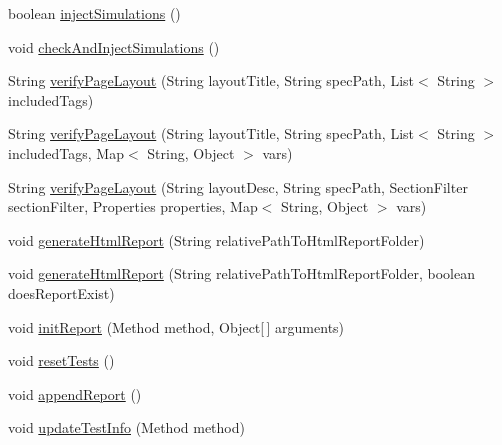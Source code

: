 \begin{DoxyCompactItemize}
\item 
boolean \hyperlink{interfacecom_1_1zeuslearning_1_1automation_1_1interactions_1_1IWindowOperations_a0976eede54bc52b1d8a75343c6d4b455}{inject\+Simulations} ()
\item 
void \hyperlink{interfacecom_1_1zeuslearning_1_1automation_1_1interactions_1_1IWindowOperations_a6f5627a3145238d63f310c22d2e3c6e5}{check\+And\+Inject\+Simulations} ()
\item 
String \hyperlink{interfacecom_1_1zeuslearning_1_1automation_1_1interactions_1_1IWindowOperations_a9908b638a8d279ad70831154e366f080}{verify\+Page\+Layout} (String layout\+Title, String spec\+Path, List$<$ String $>$ included\+Tags)
\item 
String \hyperlink{interfacecom_1_1zeuslearning_1_1automation_1_1interactions_1_1IWindowOperations_a2a4a0bf8250a1f4b6c381d14ae752e37}{verify\+Page\+Layout} (String layout\+Title, String spec\+Path, List$<$ String $>$ included\+Tags, Map$<$ String, Object $>$ vars)
\item 
String \hyperlink{interfacecom_1_1zeuslearning_1_1automation_1_1interactions_1_1IWindowOperations_a9efd4eafbe79bff5c074e053ff9fda50}{verify\+Page\+Layout} (String layout\+Desc, String spec\+Path, Section\+Filter section\+Filter, Properties properties, Map$<$ String, Object $>$ vars)
\item 
void \hyperlink{interfacecom_1_1zeuslearning_1_1automation_1_1interactions_1_1IWindowOperations_a7dba40c542d25adae5781f035e4dbb42}{generate\+Html\+Report} (String relative\+Path\+To\+Html\+Report\+Folder)
\item 
void \hyperlink{interfacecom_1_1zeuslearning_1_1automation_1_1interactions_1_1IWindowOperations_af2edf0ff09f4c8e40ed4f2f42ff00582}{generate\+Html\+Report} (String relative\+Path\+To\+Html\+Report\+Folder, boolean does\+Report\+Exist)
\item 
void \hyperlink{interfacecom_1_1zeuslearning_1_1automation_1_1interactions_1_1IWindowOperations_ab0718c55083800157948949414d2a8d8}{init\+Report} (Method method, Object\mbox{[}$\,$\mbox{]} arguments)
\item 
void \hyperlink{interfacecom_1_1zeuslearning_1_1automation_1_1interactions_1_1IWindowOperations_adcf63fd0973053422e1cfdb7221e6a13}{reset\+Tests} ()
\item 
void \hyperlink{interfacecom_1_1zeuslearning_1_1automation_1_1interactions_1_1IWindowOperations_a86e4c8b3c5bad66a1b9d7a2bf15765c8}{append\+Report} ()
\item 
void \hyperlink{interfacecom_1_1zeuslearning_1_1automation_1_1interactions_1_1IWindowOperations_a8415fde5770dfadfed5b07f514251e2c}{update\+Test\+Info} (Method method)

\end{DoxyCompactItemize}
